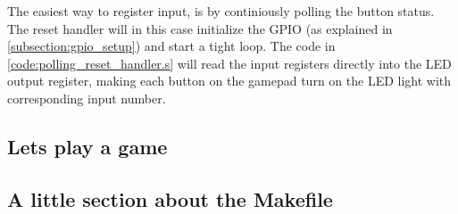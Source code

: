	The easiest way to register input, is by continiously polling the button status. The reset handler will in this case initialize the GPIO (as explained in \ref{subsection:gpio_setup}) and start a tight loop.
	The code in \ref{code:polling_reset_handler.s} will read the input registers directly into the LED output register, making each button on the gamepad turn on the LED light with corresponding input number.
	
	
	\subsection{Lets play a game}

	\subsection{A little section about the Makefile}
